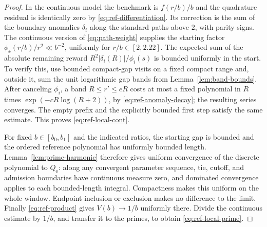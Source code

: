 \begin{proof}
In the continuous model the benchmark is $f(r/b)/b$ and the quadrature
residual is identically zero by \eqref{eq:ref-differentiation}.  Its
correction is the sum of the boundary anomalies $\delta_i$ along
the standard paths above $2$, with parity signs.  The continuous
version of \eqref{eq:path-weight} supplies the starting factor
$\phi_\ee(r/b)/r^2\ll b^{-2}$, uniformly for $r/b\in[2,2.22]$.
The expected sum of the absolute remaining reward
$R^2|\delta_i(R)|/\phi_i(s)$ is bounded uniformly in the start.
To verify this, use bounded compact-gap visits on a fixed compact
range and, outside it, sum the unit logarithmic gap bands from
Lemma~\ref{lem:band-bounds}.  After canceling $\phi_i$, a band
$R\leq r'\leq eR$ costs at most a fixed polynomial in $R$ times
$\exp(-cR\log(R+2))$, by \eqref{eq:ref-anomaly-decay}; the resulting
series converges.  The empty prefix and the explicitly bounded first
step satisfy the same estimate.  This proves
\eqref{eq:ref-local-cont}.

For fixed $b\in[b_0,b_1]$ and the indicated ratios, the starting gap
is bounded and the ordered reference polynomial has uniformly bounded
length.  Lemma~\ref{lem:prime-harmonic} therefore gives uniform
convergence of the discrete polynomial to $Q_\ee$: along any
convergent parameter sequence, tie, cutoff, and admission boundaries
have continuous measure zero, and dominated convergence applies to
each bounded-length integral.  Compactness makes this uniform on
the whole window.  Endpoint inclusion or exclusion makes no
difference to the limit.  Finally \eqref{eq:ref-product} gives
$V(b)\to1/b$ uniformly there.  Divide the continuous estimate by
$1/b$, and transfer it to the primes, to obtain
\eqref{eq:ref-local-prime}.
\end{proof}
